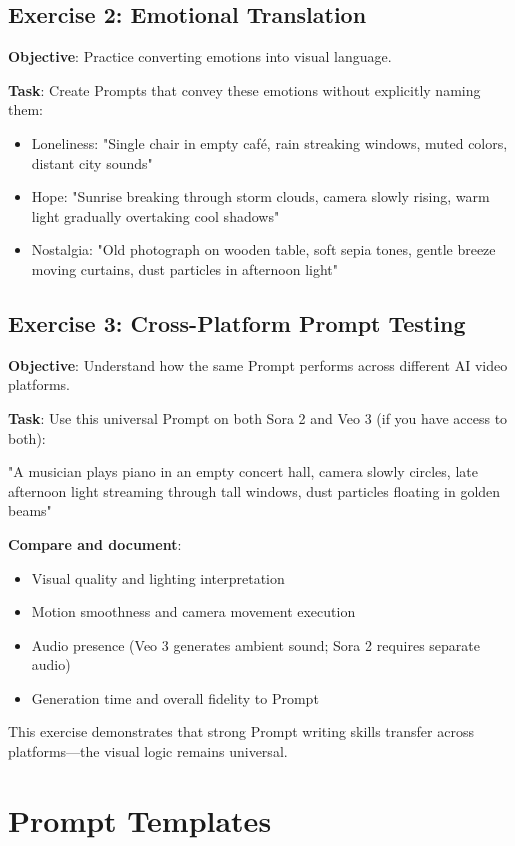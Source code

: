 \subsection*{Exercise 2: Emotional Translation}
\textbf{Objective}: Practice converting emotions into visual language.

\textbf{Task}: Create Prompts that convey these emotions without explicitly naming them:
\begin{itemize}
\item Loneliness: "Single chair in empty café, rain streaking windows, muted colors, distant city sounds"
\item Hope: "Sunrise breaking through storm clouds, camera slowly rising, warm light gradually overtaking cool shadows"
\item Nostalgia: "Old photograph on wooden table, soft sepia tones, gentle breeze moving curtains, dust particles in afternoon light"
\end{itemize}

\subsection*{Exercise 3: Cross-Platform Prompt Testing}
\textbf{Objective}: Understand how the same Prompt performs across different AI video platforms.

\textbf{Task}: Use this universal Prompt on both Sora 2 and Veo 3 (if you have access to both):
\begin{Prompt}
"A musician plays piano in an empty concert hall, camera slowly circles, late afternoon light streaming through tall windows, dust particles floating in golden beams"
\end{Prompt}

\textbf{Compare and document}:
\begin{itemize}
\item Visual quality and lighting interpretation
\item Motion smoothness and camera movement execution
\item Audio presence (Veo 3 generates ambient sound; Sora 2 requires separate audio)
\item Generation time and overall fidelity to Prompt
\end{itemize}

This exercise demonstrates that strong Prompt writing skills transfer across platforms---the visual logic remains universal.

\section*{Prompt Templates}

